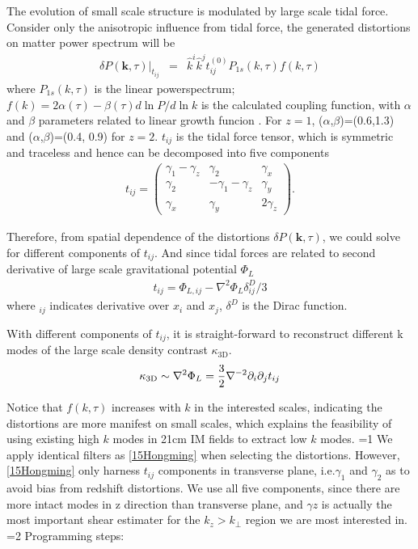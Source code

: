 The evolution of small scale structure is modulated by large scale 
tidal force. 
Consider only the anisotropic influence from tidal force, 
the generated distortions on matter power spectrum will be 
\begin{eqnarray}
\label{eq:powerdistort}
\delta P(\bm{k},\tau)|_{t_{ij}}&=&
\hat{k}^i\hat{k}^jt_{ij}^{(0)}P_{1s}(k,\tau)f(k,\tau)
\end{eqnarray}
where $P_{1s}(k,\tau)$ is the linear powerspectrum; 
$f(k)=2\alpha(\tau)-\beta(\tau)d\ln P/d\ln k$ is the calculated coupling function, 
with $\alpha$ and $\beta$ parameters related to linear growth funcion \cite{2015:zhu}. 
For $z=1$, ($\alpha$,$\beta$)=(0.6,1.3) and ($\alpha$,$\beta$)=(0.4, 0.9) for $z=2$. 
$t_{ij}$ is the tidal force tensor, 
which is symmetric and traceless 
and hence can be decomposed into five components 
\begin{eqnarray}
t_{ij}=\left( \begin{array}{ccc}
\gamma_{1}-\gamma_{z} & \gamma_{2} & \gamma_{x}\\
\gamma_{2} & -\gamma_{1}-\gamma_{z} & \gamma_{y}\\
\gamma_{x} & \gamma_{y} & 2\gamma_z
\end{array} \right).
\end{eqnarray}

Therefore, from spatial dependence of the distortions 
$\delta P(\bm{k},\tau)$, 
we could solve for different components of $t_{ij}$. 
And since tidal forces are related to second derivative 
of large scale gravitational potential $\Phi_L$ 
\begin{eqnarray}
\label{eq:tij}
t_{ij}=\Phi_{L,ij}-\nabla^2\Phi_L\delta^D_{ij}/3
\end{eqnarray}
where $_{ij}$ indicates derivative over $x_i$ and $x_j$, 
$\delta^D$ is the Dirac function.

With different components of $t_{ij}$, 
it is straight-forward to reconstruct 
different k modes of the large scale 
density contrast $\kappa_\mathrm{3D}$.
\begin{eqnarray}
    \label{eq:largepoten}
    \kappa_\mathrm{3D}\sim\nabla^2\Phi_L=\frac{3}{2}\nabla^{-2}\partial_i\partial_j t_{ij}
\end{eqnarray}

Notice that $f(k,\tau)$ increases with $k$ in the interested scales, 
indicating the distortions are more manifest on small scales, 
which explains the feasibility of using existing high $k$ modes in 21cm 
IM fields to extract low $k$ modes. 
=1
We apply identical filters as \ref{15Hongming} 
when selecting the distortions. 
However, \ref{15Hongming} only harness $t_{ij}$ components 
in transverse plane, i.e.$\gamma_1$ and $\gamma_2$ 
as to avoid bias from redshift distortions. 
We use all five components, since there are more intact modes in 
z direction than transverse plane, 
and $\gamma z$ is actually the most important 
shear estimater for the $k_z>k_\perp$ region 
we are most interested in.
\fi
{}=2
Programming steps:\noindent

